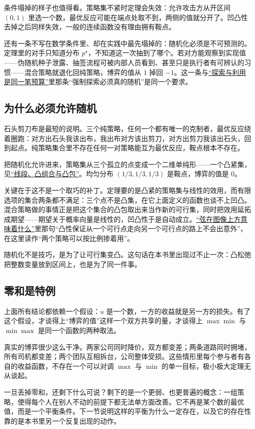 条件塌掉的样子也值得看。策略集不紧时定理会失效：允许攻击方从开区间 \((0,1)\) 里选一个数，最优反应可能在端点处取不到，两侧的值就分开了。凹凸性去掉之后同样失效，一般的连续函数没有理由拥有鞍点。

还有一条不写在数学条件里、却在实践中最先塌掉的：随机化必须是不可预测的。定理里的对手只知道分布 \(p^\star\)，不知道这一次抽到了哪个。若对方能观察到实现值——伪随机种子泄露、抽签流程可被内部人员看到、甚至只是执行者有可辨认的习惯——混合策略就退化回纯策略，博弈的值从 \(1\) 掉回 \(-1\)。这一条与\hyperref[sec:17-Constrained-Guarantees/04-Online-Learning-and-Regret/03]{``探索与利用是同一笔预算''}里那条``强制探索必须真的随机''是同一个要求。

\subsection{为什么必须允许随机}

石头剪刀布是最短的说明。三个纯策略，任何一个都有唯一的克制者，最优反应绕着圈跑：对方出石头我该出布，我出布对方该出剪刀，对方出剪刀我该出石头，回到起点。纯策略集合里不存在任何一对策略能互为最优反应，鞍点根本不存在。

把随机化允许进来，策略集从三个孤立的点变成一个二维单纯形——一个凸紧集，见\hyperref[sec:09-Convex-Optimization/02-Convex-Sets/01]{``线段、凸组合与凸包''}。均匀分布 \((1/3,1/3,1/3)\) 是鞍点，博弈的值是 \(0\)。

关键在于这不是一个取巧的补丁。定理要的是凸紧的策略集与线性的效用，而有限选项的集合两条都不满足：三个点不是凸集，在它上面定义的函数也谈不上凹凸。混合策略做的事情正是把这个集合的凸包取出来当作新的可行集，同时把效用延拓成期望——期望关于概率向量是线性的，凹凸性于是自动成立。\hyperref[sec:09-Convex-Optimization/03-Convex-Functions/01]{``弦在图像上方意味着什么''}里那句``凸性保证从一个可行点走向另一个可行点的路上不会出意外''，在这里读作``两个策略可以按比例掺着用''。

随机化不是技巧，是为了让可行集变凸。这句话在本书里出现过不止一次：凸松弛把整数变量放到区间上，也是为了同一件事。

\subsection{零和是特例}

上面所有结论都依赖一个假设：\(u\) 是一个数，一方的收益就是另一方的损失。有了这个假设，才谈得上``博弈的值''这样一个双方共享的量，才谈得上 \(\max\min\) 与 \(\min\max\) 是同一个函数的两种取法。

真实的博弈很少这么干净。两家公司同时降价，双方都变差；两条道路同时拥堵，所有司机都变差；两个团队互相拆台，公司整体受损。这些情形里每个参与者有各自的收益函数，不存在一个可以对调 \(\max\) 与 \(\min\) 的单一目标，极小极大定理无从谈起。

一旦丢掉零和，还剩下什么可说？剩下的是一个更弱、也更普遍的概念：一组策略，使得每个人在别人不动的前提下都无法单方面改善。它不再是某个数的最优值，而是一个平衡条件。下一节说明这样的平衡为什么一定存在，以及它的存在性靠的是本书里另一个反复出现的动作。
